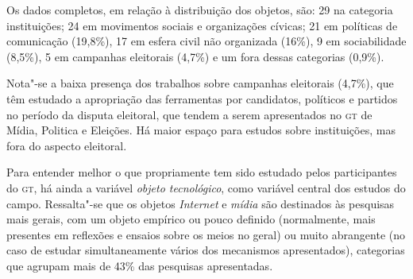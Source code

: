 {Os dados completos, em relação à distribuição dos objetos, são: 29 na categoria instituições; 24 em movimentos sociais e organizações cívicas; 21 em políticas de comunicação (19,8\%), 17 em esfera civil não organizada (16\%), 9 em sociabilidade (8,5\%), 5 em campanhas eleitorais (4,7\%) e um fora dessas categorias (0,9\%).

Nota"-se a baixa presença dos trabalhos sobre campanhas eleitorais
(4,7\%), que têm estudado a apropriação das ferramentas por candidatos,
políticos e partidos no período da disputa eleitoral, que tendem a serem
apresentados no \textsc{gt} de Mídia, Politica e Eleições. Há maior espaço para
estudos sobre instituições, mas fora do aspecto eleitoral.

Para entender melhor o que propriamente tem sido estudado pelos
participantes do \textsc{gt}, há ainda a variável \textit{objeto tecnológico}, como
variável central dos estudos do campo. Ressalta"-se que os objetos
\textit{Internet} e \textit{mídia} são destinados às pesquisas mais gerais, com um
objeto empírico ou pouco definido (normalmente, mais presentes em
reflexões e ensaios sobre os meios no geral) ou muito abrangente (no
caso de estudar simultaneamente vários dos mecanismos apresentados),
categorias que agrupam mais de 43\% das pesquisas apresentadas.

}
